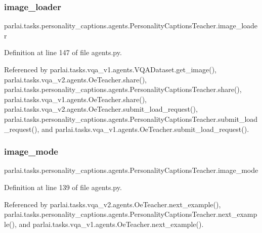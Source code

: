 \subsubsection{\texorpdfstring{image\+\_\+loader}{image\_loader}}
{\footnotesize\ttfamily parlai.\+tasks.\+personality\+\_\+captions.\+agents.\+Personality\+Captions\+Teacher.\+image\+\_\+loader}



Definition at line 147 of file agents.\+py.



Referenced by parlai.\+tasks.\+vqa\+\_\+v1.\+agents.\+V\+Q\+A\+Dataset.\+get\+\_\+image(), parlai.\+tasks.\+vqa\+\_\+v2.\+agents.\+Oe\+Teacher.\+share(), parlai.\+tasks.\+personality\+\_\+captions.\+agents.\+Personality\+Captions\+Teacher.\+share(), parlai.\+tasks.\+vqa\+\_\+v1.\+agents.\+Oe\+Teacher.\+share(), parlai.\+tasks.\+vqa\+\_\+v2.\+agents.\+Oe\+Teacher.\+submit\+\_\+load\+\_\+request(), parlai.\+tasks.\+personality\+\_\+captions.\+agents.\+Personality\+Captions\+Teacher.\+submit\+\_\+load\+\_\+request(), and parlai.\+tasks.\+vqa\+\_\+v1.\+agents.\+Oe\+Teacher.\+submit\+\_\+load\+\_\+request().

\mbox{\label{classparlai_1_1tasks_1_1personality__captions_1_1agents_1_1PersonalityCaptionsTeacher_af5270ae375452d4d43999523551ab14d}} 
\subsubsection{\texorpdfstring{image\+\_\+mode}{image\_mode}}
{\footnotesize\ttfamily parlai.\+tasks.\+personality\+\_\+captions.\+agents.\+Personality\+Captions\+Teacher.\+image\+\_\+mode}



Definition at line 139 of file agents.\+py.



Referenced by parlai.\+tasks.\+vqa\+\_\+v2.\+agents.\+Oe\+Teacher.\+next\+\_\+example(), parlai.\+tasks.\+personality\+\_\+captions.\+agents.\+Personality\+Captions\+Teacher.\+next\+\_\+example(), and parlai.\+tasks.\+vqa\+\_\+v1.\+agents.\+Oe\+Teacher.\+next\+\_\+example().

